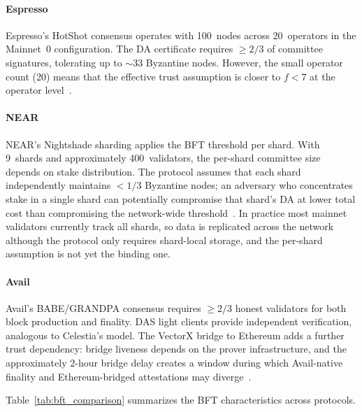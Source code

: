 \paragraph{Espresso}
Espresso's HotShot consensus operates with 100~nodes across 20~operators in the Mainnet~0 configuration.
The DA certificate requires $\geq 2/3$ of committee signatures, tolerating up to $\sim$33 Byzantine nodes.
However, the small operator count (20) means that the effective trust assumption is closer to $f < 7$ at the operator level~\cite{Espresso:Hotshot_and_Triamisu}.

\paragraph{NEAR}
NEAR's Nightshade sharding applies the BFT threshold per shard.
With 9~shards and approximately 400~validators, the per-shard committee size depends on stake distribution.
The protocol assumes that each shard independently maintains $< 1/3$ Byzantine nodes; an adversary who concentrates stake in a single shard can potentially compromise that shard's DA at lower total cost than compromising the network-wide threshold~\cite{NEAR_Nightshade_Scaling_Blockchain}.
In practice most mainnet validators currently track all shards, so data is replicated across the network although the protocol only requires shard-local storage, and the per-shard assumption is not yet the binding one.

\paragraph{Avail}
Avail's BABE/GRANDPA consensus requires $\geq 2/3$ honest validators for both block production and finality.
DAS light clients provide independent verification, analogous to Celestia's model.
The VectorX bridge to Ethereum adds a further trust dependency: bridge liveness depends on the prover infrastructure, and the approximately 2-hour bridge delay creates a window during which Avail-native finality and Ethereum-bridged attestations may diverge~\cite{Avail_The_DA_Blockchain}.

Table~\ref{tab:bft_comparison} summarizes the BFT characteristics across protocols.

